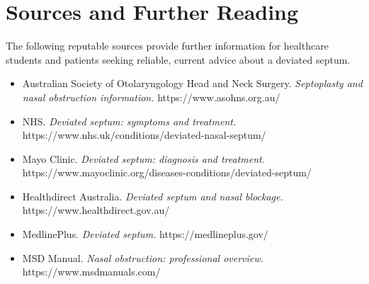 \section*{Sources and Further Reading}
The following reputable sources provide further information for healthcare students and patients seeking reliable, current advice about a deviated septum.

\begin{itemize}
    \item Australian Society of Otolaryngology Head and Neck Surgery. \textit{Septoplasty and nasal obstruction information.} https://www.asohns.org.au/
    \item NHS. \textit{Deviated septum: symptoms and treatment.} https://www.nhs.uk/conditions/deviated-nasal-septum/
    \item Mayo Clinic. \textit{Deviated septum: diagnosis and treatment.} https://www.mayoclinic.org/diseases-conditions/deviated-septum/
    \item Healthdirect Australia. \textit{Deviated septum and nasal blockage.} https://www.healthdirect.gov.au/
    \item MedlinePlus. \textit{Deviated septum.} https://medlineplus.gov/
    \item MSD Manual. \textit{Nasal obstruction: professional overview.} https://www.msdmanuals.com/
\end{itemize}
